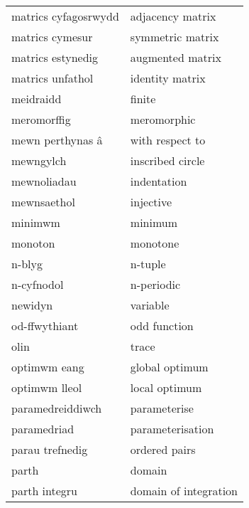 \begin{supertabular}{p{0.22\textwidth}p{0.22\textwidth}}
            matrics cyfagosrwydd &                  adjacency matrix \\
                 matrics cymesur &                  symmetric matrix \\
               matrics estynedig &                  augmented matrix \\
                matrics unfathol &                   identity matrix \\
                       meidraidd &                            finite \\
                     meromorffig &                       meromorphic \\
                mewn perthynas â &                   with respect to \\
                       mewngylch &                  inscribed circle \\
                     mewnoliadau &                       indentation \\
                     mewnsaethol &                         injective \\
                         minimwm &                           minimum \\
                         monoton &                          monotone \\
                          n-blyg &                           n-tuple \\
                      n-cyfnodol &                        n-periodic \\
                         newidyn &                          variable \\
                   od-ffwythiant &                      odd function \\
                            olin &                             trace \\
                    optimwm eang &                    global optimum \\
                   optimwm lleol &                     local optimum \\
                paramedreiddiwch &                      parameterise \\
                     paramedriad &                  parameterisation \\
                 parau trefnedig &                     ordered pairs \\
                           parth &                            domain \\
                   parth integru &             domain of integration \\

\end{supertabular}
